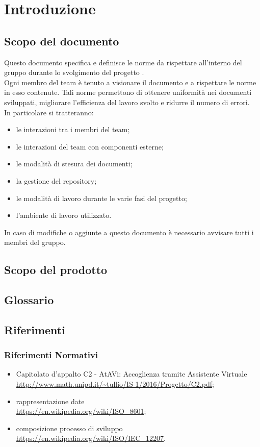 \section{Introduzione}
	\subsection{Scopo del documento}
	Questo documento specifica e definisce le norme da rispettare all'interno del gruppo \GRUPPO{} durante lo svolgimento del progetto \PROGETTO. \\
	Ogni membro del team è tenuto a visionare il documento e a rispettare le norme in esso contenute. Tali norme permettono di ottenere uniformità nei documenti sviluppati,
	migliorare l'efficienza del lavoro svolto e ridurre il numero di errori. \\
	In particolare si tratteranno:
	\begin{itemize}
		\item le interazioni tra i membri del team;
		\item le interazioni del team con componenti esterne;
		\item le modalità di stesura dei documenti;
		\item la gestione del repository;
		\item le modalità di lavoro durante le varie fasi del progetto;
		\item l'ambiente di lavoro utilizzato.
	\end{itemize}
	In caso di modifiche o aggiunte a questo documento è necessario avvisare tutti i membri del gruppo.
	\subsection{Scopo del prodotto}
		\SCOPO
	\subsection{Glossario}
		\GLOSSARIO
	\subsection{Riferimenti}
		\subsubsection{Riferimenti Normativi}
		\begin{itemize}
		\item Capitolato d'appalto C2 - AtAVi: Accoglienza tramite Assistente Virtuale \\
		\url{http://www.math.unipd.it/~tullio/IS-1/2016/Progetto/C2.pdf};
		\item rappresentazione date \\
		\url{https://en.wikipedia.org/wiki/ISO_8601};
		\item composizione processo di sviluppo \\
		\url{https://en.wikipedia.org/wiki/ISO/IEC_12207}.
\newpage
	\end{itemize}
